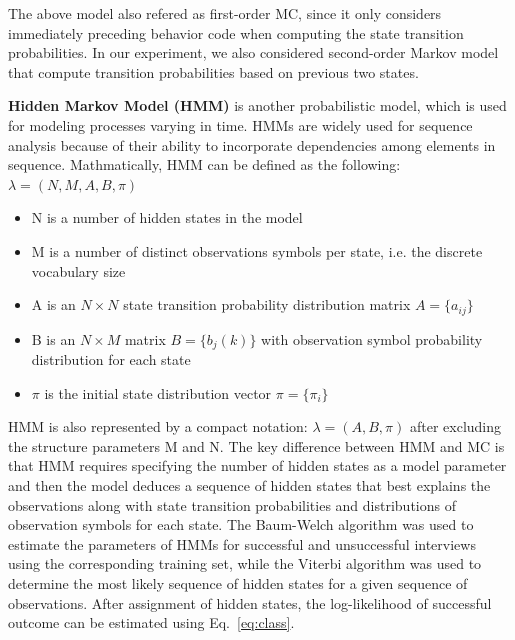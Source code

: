 \documentclass{amia_summit_2018}
\begin{document}
The above model also refered as first-order MC, since it only considers immediately preceding behavior code when computing the state transition probabilities. In our experiment, we also considered second-order Markov model that compute transition probabilities based on previous two states.  

\textbf {Hidden Markov Model (HMM)} is another probabilistic model, which is used for modeling processes varying in time. HMMs are widely used for sequence analysis because of their ability to incorporate dependencies among elements in sequence. Mathmatically, HMM can be defined as the following: $\lambda = (N, M, A, B, \pi)$
\begin{itemize}
\item N is a number of hidden states in the model
\item M is a number of distinct observations symbols per state, i.e. the discrete vocabulary size
\item A is an $N\times N$ state transition probability distribution matrix $A = \{a_{ij}\}$
\item B is an $N\times M$ matrix $B = \{b_j(k)\}$ with observation symbol probability distribution for each state 
\item $\pi$ is the initial state distribution vector $\pi = \{\pi_i\}$
\end{itemize}
HMM is also represented by a compact notation: $\lambda = (A, B, \pi)$ after excluding the structure parameters M and N. The key difference between HMM and MC is that HMM requires specifying the number of hidden states as a model parameter and then the model deduces a sequence of hidden states that best explains the observations along with state transition probabilities and distributions of observation symbols for each state. The Baum-Welch algorithm was used to estimate the parameters of HMMs for successful and unsuccessful interviews using the corresponding training set, while the Viterbi algorithm was used to determine the most likely sequence of hidden states for a given sequence of observations. After assignment of hidden states, the log-likelihood of successful outcome can be estimated using Eq.~\ref{eq:class}.
\end{document}
